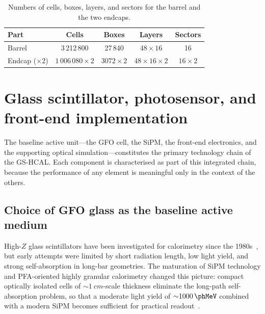 \begin{table}[htbp]
\centering
\caption{Numbers of cells, boxes, layers, and sectors for the barrel
and the two endcaps.}
\label{tab:GSHCALQuantities}
\begin{tabular}{lcccc}
\toprule
\textbf{Part} & \textbf{Cells} & \textbf{Boxes} & \textbf{Layers} &
\textbf{Sectors} \\
\midrule
Barrel             & 3\,212\,800          & 27\,840        & $48\times16$
& 16 \\
Endcap ($\times2$) & $1\,006\,080\times2$ & $3072\times2$  &
$48\times16\times2$ & $16\times2$ \\
\bottomrule
\end{tabular}
\end{table}

\section{Glass scintillator, photosensor, and front-end implementation}
\label{sec:activeunit}

The baseline active unit---the GFO cell, the SiPM, the front-end
electronics, and the supporting optical simulation---constitutes the
primary technology chain of the GS-HCAL.
Each component is characterised as part of this integrated chain,
because the performance of any element is meaningful only in the
context of the others.

\subsection{Choice of GFO glass as the baseline active medium}
\label{subsec:gfo}

High-$Z$ glass scintillators have been investigated for calorimetry
since the 1980s~\cite{Buchner:1988fu}, but early attempts were limited
by short radiation length, low light yield, and strong self-absorption
in long-bar geometries.
The maturation of SiPM technology and PFA-oriented highly granular
calorimetry changed this picture: compact optically isolated cells of
${\sim}\SI{1}{cm}$-scale thickness eliminate the long-path
self-absorption problem, so that a moderate light yield of
${\sim}\SI{1000}{\phMeV}$ combined with a modern SiPM becomes
sufficient for practical readout~\cite{Tang:2022yrb,Hu:2023dbm,
Hu:2024nvo}.

